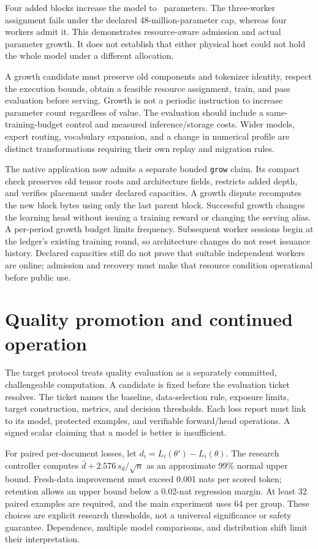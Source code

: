 \documentclass[11pt]{article}
\begin{document}
Four added blocks increase the model to \GrownParameters\ parameters. The three-worker assignment fails under the declared 48-million-parameter cap, whereas four workers admit it. This demonstrates resource-aware admission and actual parameter growth. It does not establish that either physical host could not hold the whole model under a different allocation.

A growth candidate must preserve old components and tokenizer identity, respect the execution bounds, obtain a feasible resource assignment, train, and pass evaluation before serving. Growth is not a periodic instruction to increase parameter count regardless of value. The evaluation should include a same-training-budget control and measured inference/storage costs. Wider models, expert routing, vocabulary expansion, and a change in numerical profile are distinct transformations requiring their own replay and migration rules.

The native application now admits a separate bonded \texttt{grow} claim. Its
compact check preserves old tensor roots and architecture fields, restricts
added depth, and verifies placement under declared capacities. A growth dispute
recomputes the new block bytes using only the last parent block. Successful
growth changes the learning head without issuing a training reward or changing
the serving alias. A per-period growth budget limits frequency. Subsequent
worker sessions begin at the ledger's existing training round, so architecture
changes do not reset issuance history. Declared capacities still do not prove
that suitable independent workers are online; admission and recovery must make
that resource condition operational before public use.

\section{Quality promotion and continued operation}
The target protocol treats quality evaluation as a separately committed, challengeable computation. A candidate is fixed before the evaluation ticket resolves. The ticket names the baseline, data-selection rule, exposure limits, target construction, metrics, and decision thresholds. Each loss report must link to its model, protected examples, and verifiable forward/head operations. A signed scalar claiming that a model is better is insufficient.

For paired per-document losses, let $d_i=L_i(\theta')-L_i(\theta)$. The research controller computes $\bar d+2.576\,s_d/\sqrt{n}$ as an approximate 99\% normal upper bound. Fresh-data improvement must exceed 0.001 nats per scored token; retention allows an upper bound below a 0.02-nat regression margin. At least 32 paired examples are required, and the main experiment uses 64 per group. These choices are explicit research thresholds, not a universal significance or safety guarantee. Dependence, multiple model comparisons, and distribution shift limit their interpretation.
\end{document}
